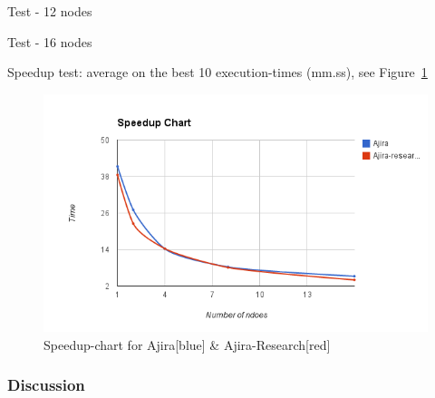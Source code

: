 \newpage

Test - 12 nodes
\newline \newline
\renewcommand{\arraystretch}{1.2}
{\footnotesize\tt

}

Test - 16 nodes
\newline \newline
\renewcommand{\arraystretch}{1.2}
{\footnotesize\tt

}

\newpage

Speedup test: average on the best 10 execution-times (mm.ss), see Figure~\ref{fig:speedup}
\newline \newline
\renewcommand{\arraystretch}{1.2}
{\footnotesize\tt

}

\begin{figure}
\centering
\includegraphics[scale=0.6]{speedup}
\caption{Speedup-chart for Ajira[blue] \& Ajira-Research[red]}
\label{fig:speedup}
\end{figure}

% 
\subsubsection*{Discussion}

